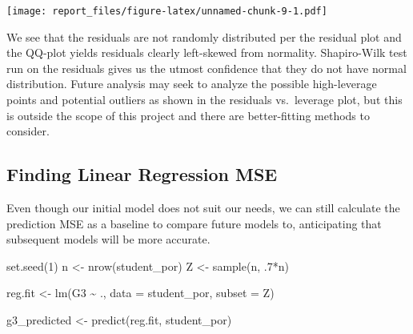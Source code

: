 \documentclass[
]{article}
\newenvironment{Shaded}{\begin{snugshade}}{\end{snugshade}}
\newcommand{\AttributeTok}[1]{\textcolor[rgb]{0.77,0.63,0.00}{#1}}
\newcommand{\DecValTok}[1]{\textcolor[rgb]{0.00,0.00,0.81}{#1}}
\newcommand{\FunctionTok}[1]{\textcolor[rgb]{0.00,0.00,0.00}{#1}}
\newcommand{\NormalTok}[1]{#1}
\newcommand{\OtherTok}[1]{\textcolor[rgb]{0.56,0.35,0.01}{#1}}
\newcommand{\SpecialCharTok}[1]{\textcolor[rgb]{0.00,0.00,0.00}{#1}}
\newcommand{\StringTok}[1]{\textcolor[rgb]{0.31,0.60,0.02}{#1}}
\begin{document}
\texttt{[image: report\_files/figure-latex/unnamed-chunk-9-1.pdf]}

We see that the residuals are not randomly distributed per the residual
plot and the QQ-plot yields residuals clearly left-skewed from
normality. Shapiro-Wilk test run on the residuals gives us the utmost
confidence that they do not have normal distribution. Future analysis
may seek to analyze the possible high-leverage points and potential
outliers as shown in the residuals vs.~leverage plot, but this is
outside the scope of this project and there are better-fitting methods
to consider.

\hypertarget{finding-linear-regression-mse}{%
\subsection{Finding Linear Regression
MSE}\label{finding-linear-regression-mse}}

Even though our initial model does not suit our needs, we can still
calculate the prediction MSE as a baseline to compare future models to,
anticipating that subsequent models will be more accurate.

\begin{Shaded}
\begin{Highlighting}[]
\FunctionTok{set.seed}\NormalTok{(}\DecValTok{1}\NormalTok{)}
\NormalTok{n }\OtherTok{\textless{}{-}} \FunctionTok{nrow}\NormalTok{(student\_por)}
\NormalTok{Z }\OtherTok{\textless{}{-}} \FunctionTok{sample}\NormalTok{(n, .}\DecValTok{7}\SpecialCharTok{*}\NormalTok{n)}

\NormalTok{reg.fit }\OtherTok{\textless{}{-}} \FunctionTok{lm}\NormalTok{(G3 }\SpecialCharTok{\textasciitilde{}}\NormalTok{ ., }\AttributeTok{data =}\NormalTok{ student\_por, }\AttributeTok{subset =}\NormalTok{ Z)}
\end{Highlighting}
\end{Shaded}

\begin{Shaded}
\begin{Highlighting}[]
\NormalTok{g3\_predicted }\OtherTok{\textless{}{-}} \FunctionTok{predict}\NormalTok{(reg.fit, student\_por)}
\end{Highlighting}
\end{Shaded}

\begin{Shaded}
\end{Shaded}
\end{document}
